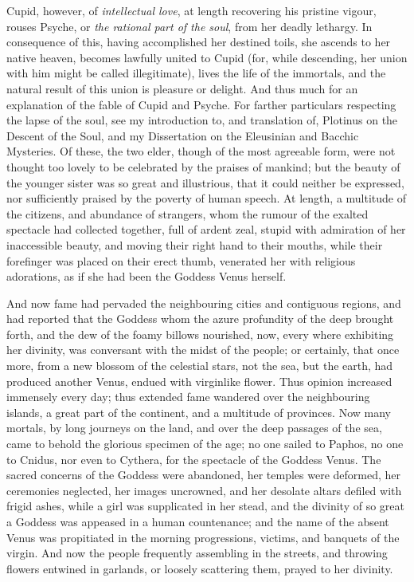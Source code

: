 \documentclass{article}
\begin{document}
{Cupid, however, of \textit{intellectual love}, at length recovering his
pristine vigour, rouses Psyche, or \textit{the rational part of the soul}, from
her deadly lethargy. In consequence of this, having accomplished her destined
toils, she ascends to her native heaven, becomes lawfully united to Cupid (for,
while descending, her union with him might be called illegitimate), lives the
life of the immortals, and the natural result of this union is pleasure or
delight. And thus much for an explanation of the fable of Cupid and Psyche. For
farther particulars respecting the lapse of the soul, see my introduction to,
and translation of, Plotinus on the Descent of the Soul, and my Dissertation on
the Eleusinian and Bacchic Mysteries.} Of these, the two elder, though of the
most agreeable form, were not thought too lovely to be celebrated by the
praises of mankind; but the beauty of the younger sister was so great and
illustrious, that it could neither be expressed, nor sufficiently praised by
the poverty of human speech. At length, a multitude of the citizens, and
abundance of strangers, whom the rumour of the exalted spectacle had collected
together, full of ardent zeal, stupid with admiration of her inaccessible
beauty, and moving their right hand to their mouths, while their forefinger was
placed on their erect thumb, venerated her with religious adorations, as if she
had been the Goddess Venus herself.

And now fame had pervaded the neighbouring cities and contiguous regions, and
had reported that the Goddess whom the azure profundity of the deep brought
forth, and the dew of the foamy billows nourished, now, every where exhibiting
her divinity, was conversant with the midst of the people; or certainly, that
once more, from a new blossom of the celestial stars, not the sea, but the
earth, had produced another Venus, endued with virginlike flower. Thus opinion
increased immensely every day; thus extended fame wandered over the
neighbouring islands, a great part of the continent, and a multitude of
provinces. Now many mortals, by long journeys on the land, and over the deep
passages of the sea, came to behold the glorious specimen of the age; no one
sailed to Paphos, no one to Cnidus, nor even to Cythera, for the spectacle of
the Goddess Venus. The sacred concerns of the Goddess were abandoned, her
temples were deformed, her ceremonies neglected, her images uncrowned, and her
desolate altars defiled with frigid ashes, while a girl was supplicated in her
stead, and the divinity of so great a Goddess was appeased in a human
countenance; and the name of the absent Venus was propitiated in the morning
progressions, victims, and banquets of the virgin. And now the people
frequently assembling in the streets, and throwing flowers entwined in
garlands, or loosely scattering them, prayed to her divinity.
\end{document}
